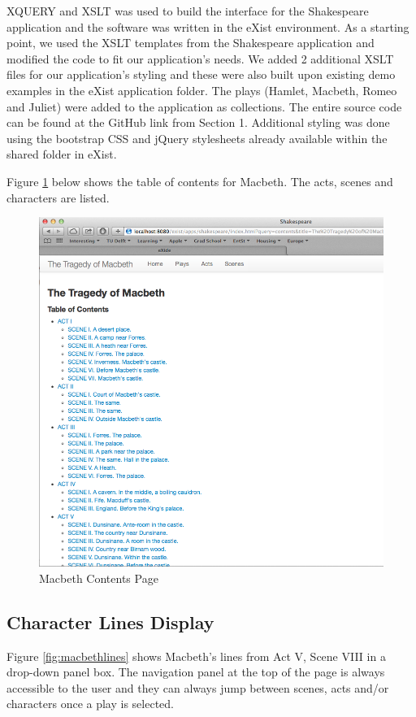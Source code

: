 \documentclass[Shakespeare.tex]{subfiles}
\begin{document}
XQUERY and XSLT was used to build the interface for the Shakespeare application and the software was written in the eXist environment. As a starting point, we used the XSLT templates from the Shakespeare application and modified the code to fit our application's needs. We added 2 additional XSLT files for our application's styling and these were also built upon existing demo examples in the eXist application folder. The plays (Hamlet, Macbeth, Romeo and Juliet) were added to the application as collections. The entire source code can be found at the GitHub link from Section 1. Additional styling was done using the bootstrap CSS and jQuery stylesheets already available within the shared folder in eXist.

Figure \ref{fig:macbethtoc} below shows the table of contents for Macbeth. The acts, scenes and characters are listed.
\begin{figure} [H]
	\centering
	\includegraphics[width=1\textwidth]{./Figures/MacbethTOC.png}
	\caption{Macbeth Contents Page}
	\label{fig:macbethtoc}
\end{figure}

\subsection{Character Lines Display}
Figure \ref{fig:macbethlines} shows Macbeth's lines from Act V, Scene VIII in a drop-down panel box. The navigation panel at the top of the page is always accessible to the user and they can always jump between scenes, acts and/or characters once a play is selected.
\end{document}
